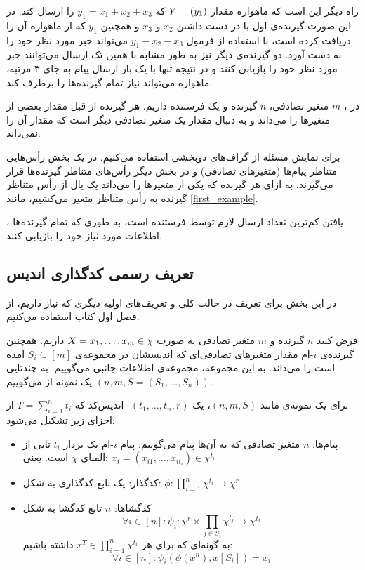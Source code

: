 راه دیگر این است که ماهواره مقدار
$Y = (y_1)$
که
$y_1 = x_1 + x_2 + x_3$
را ارسال کند. در این صورت گیرنده‌ی اول با در دست داشتن
$x_2$
و
$x_3$
و همچنین
$y_1$
که از ماهواره آن را دریافت کرده است، با استفاده از فرمول
$y_1 - x_2 - x_3$
می‌تواند خبر مورد نظر خود را به دست آورد. دو گیرنده‌ی دیگر نیز به طور مشابه با همین تک ارسال می‌توانند خبر مورد نظر خود را بازیابی کنند و در نتیجه تنها با یک بار ارسال پیام به جای ۳ مرتبه، ماهواره می‌تواند نیاز تمام گیرنده‌ها را برطرف کند.

در 
\icods،
$m$
متغیر تصادفی،
$n$
گیرنده و یک فرستنده داریم. هر گیرنده از قبل مقدار بعضی از متغیرها را می‌داند و به دنبال مقدار یک متغیر تصادفی دیگر است که مقدار آن را نمی‌داند.

برای نمایش مسئله از گراف‌های دوبخشی استفاده می‌کنیم. در یک بخش رأس‌هایی متناظر پیام‌ها (متغیرهای تصادفی) و در بخش دیگر رأس‌های متناظر گیرنده‌ها قرار می‌گیرند. به ازای هر گیرنده که یکی از متغیرها را می‌داند یک یال از رأس متناظر گیرنده به رأس متناظر متغیر می‌کشیم، مانند \autoref{first_example}.

\icods،
یافتن کم‌ترین تعداد ارسال لازم توسط فرستنده است، به طوری که تمام گیرنده‌ها اطلاعات مورد نیاز خود را بازیابی کنند.
	\subsection{تعریف رسمی کدگذاری اندیس}
در این بخش برای تعریف 
\icod
در حالت کلی و تعریف‌های اولیه دیگری که نیاز داریم، از فصل اول کتاب
\cite{fatemehbook}
استفاده می‌کنیم.
\begin{definition}[\icods]
	فرض کنید
	$n$
	گیرنده و
	$m$
	متغیر تصادفی به صورت
	$X = x_1, \ldots, x_m \in \chi$
	داریم. همچنین گیرنده‌ی
	$i$-ام
	مقدار متغیرهای تصادفی‌ای که اندیسشان در مجموعه‌ی
	$S_i \subseteq [m]$
	آمده است را می‌داند.	به این مجموعه، مجموعه‌ی اطلاعات جانبی می‌گوییم. به چندتایی
	$(n, m, S =(S_1, \ldots, S_n) )$
	یک نمونه از
	\icod
	می‌گوییم.
\end{definition}
\begin{definition}[اندیس‌کد]
	\label{def:icod}
	برای یک نمونه‌ی \icod مانند
	$(n, m, S)$،
	یک
	$(t_1, \ldots, t_n, r)$
	-اندیس‌کد که
	$T = \sum_{i = 1}^{n} t_i$
	 از اجزای زیر تشکیل می‌شود:
	\begin{itemize}
		\item 
      پیام‌ها:
		$n$
		 متغیر تصادفی که به آن‌ها پیام می‌گوییم. پیام
		  $i$-ام
            یک بردار 
		  $t_i$ تایی
            از الفبای
		  $\chi$
		  است. یعنی:
		  $x_i = (x_{i1}, \ldots, x_{it_i}) \in \chi^{t_i}$
		  \item
		  کدگذار:
		   یک تابع کدگذاری به شکل:
		   $\phi: \prod\limits_{i = 1}^n \chi^{t_i}  \rightarrow \chi^r$
		  \item
		  کدگشاها:
		  $n$
		  تابع کدگشا به شکل
		  $$\forall i \in [n]: \psi_i: \chi^r \times  \prod\limits_{j \in S_i} \chi^{t_j} \rightarrow \chi^{t_i}$$
		  به گونه‌ای که برای هر
		  $x^T \in \prod\limits_{i = 1}^{n} \chi^{t_i}$
		  داشته باشیم:
		  $$\forall i \in [n]: \psi_i(\phi(x^n), x[S_i]) = x_i$$
	\end{itemize}
\end{definition}

